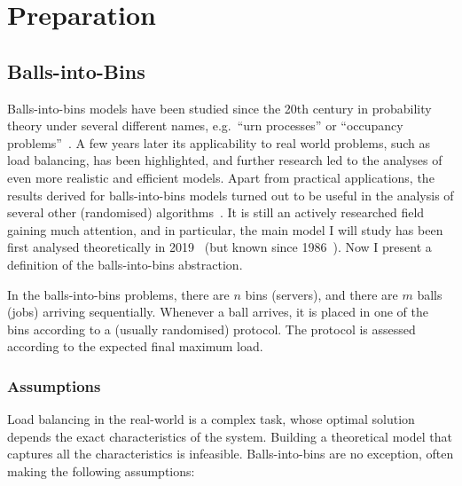 \chapter{Preparation}\label{preparation}

\ifpdf
    \graphicspath{{Chapter2/Figs/Raster/}{Chapter2/Figs/PDF/}{Chapter2/Figs/}}
\else
    \graphicspath{{Chapter2/Figs/Vector/}{Chapter2/Figs/}}
\fi



\section{Balls-into-Bins}


Balls-into-bins models have been studied since the 20th century in probability theory under several different names, e.g.\ ``urn processes'' or ``occupancy problems''~\cite{kolchin1978coined}. A few years later its applicability to real world problems, such as load balancing, has been highlighted, and further research led to the analyses of even more realistic and efficient models. Apart from practical applications, the results derived for balls-into-bins models turned out to be useful in the analysis of several other (randomised) algorithms~\cite{edmonds2006cakecutting}. It is still an actively researched field gaining much attention, and in particular, the main model I will study has been first analysed theoretically in 2019~\cite{dwivedi2019firstthinning} (but known since 1986~\cite{derek1986twothinningfirstattempt}). Now I present a definition of the balls-into-bins abstraction.



\begin{definition} \label{definition: balls-into-bins}
In the balls-into-bins problems, there are $n$ bins (servers), and there are $m$ balls (jobs) arriving sequentially. Whenever a ball arrives, it is placed in one of the bins according to a (usually randomised) protocol. The protocol is assessed according to the expected final maximum load.
\end{definition}



\subsection{Assumptions} \label{assumptions}



Load balancing in the real-world is a complex task, whose optimal solution depends the exact characteristics of the system. Building a theoretical model that captures all the characteristics is infeasible. Balls-into-bins are no exception, often making the following assumptions:


